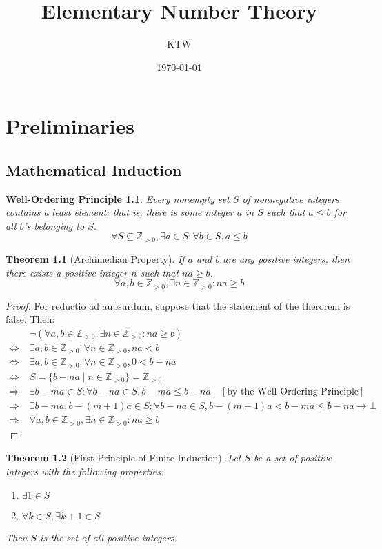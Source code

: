 \documentclass[atbegshi, chapter]{memoir}
\title{Elementary Number Theory}
\author{KTW}
\date{\today}
\newtheorem{thm}{Theorem}[chapter]
\newtheorem*{WOP}{Well-Ordering Principle}
\begin{document}
\maketitle\thispagestyle{empty}\newpage
\tableofcontents
\chapter{Preliminaries}
\section{Mathematical Induction}
\begin{WOP}
  Every nonempty set $S$ of nonnegative integers contains a least element;
  that is, there is some integer $a$ in $S$ such that $a\leq b$ for all 
  $b$'s belonging to $S$.
  \[
    \forall S \subseteq\mathbb{Z}_{>0}, \exists a\in S:\forall b\in S, a \leq b
  \]
\end{WOP}
\begin{thm}[Archimedian Property]
  If $a$ and $b$ are any positive integers, then there exists a positive
  integer $n$ such that $na\geq b$.
  \[
    \forall a,b\in\mathbb{Z}_{>0}, \exists n\in\mathbb{Z}_{>0}:na\geq b
  \]
\end{thm}
\begin{proof}
  For reductio ad aubsurdum, suppose that the statement of the therorem is
  false. Then:
  \begin{align*}
  &\neg(\forall a,b\in\mathbb{Z}_{>0},\exists n\in\mathbb{Z}_{>0}:na\geq b)\\
    \Leftrightarrow\;&\exists a,b\in\mathbb{Z}_{>0}: \forall n\in\mathbb{Z}_{>0}, na<b\\
  \Leftrightarrow\;&\exists a,b\in\mathbb{Z}_{>0}: \forall n\in\mathbb{Z}_{>0},0<b-na\\
  \Leftrightarrow\;&S=\{b-na\;|\;n\in\mathbb{Z}_{>0}\} = \mathbb{Z}_{>0}\\
  \Rightarrow\;&\exists b-ma\in S:\forall b-na\in S, b-ma\leq b-na
  \quad[\textrm{by the Well-Ordering Principle}]\\
  \Rightarrow\;& \exists b-ma, b-(m+1)a\in S:\forall b-na\in S,
  b-(m+1)a < b-ma\leq b-na \longrightarrow\bot \\
  \Rightarrow\;&\forall a,b\in\mathbb{Z}_{>0},\exists n\in\mathbb{Z}_{>0}:na\geq b
  \end{align*}
\end{proof}
\begin{thm}[First Principle of Finite Induction]
  Let $S$ be a set of positive integers with the following properties:
  \begin{enumerate}[label=(\alph*)]
    \item $\exists 1\in S$
    \item $\forall k\in S, \exists k+1\in S$
  \end{enumerate}
  Then $S$ is the set of all positive integers.
\end{thm}
\end{document}
